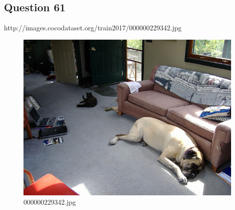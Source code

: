 \subsection*{Question 61}
http://images.cocodataset.org/train2017/000000229342.jpg
\begin{figure}[h]
    \centering
    \includegraphics[width=0.8\linewidth]{../image set/hard/000000229342.jpg}
    \caption{000000229342.jpg}
\end{figure}
